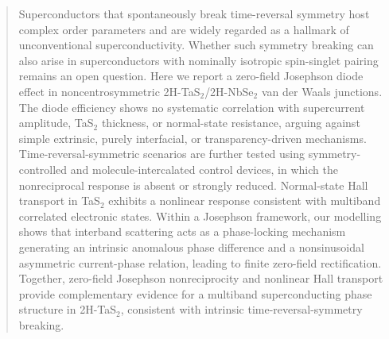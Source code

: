\documentclass[twocolumn,secnumarabic,amssymb, nobibnotes, aps, prl, superscriptaddress]{revtex4-2}
\begin{document}
\begin{abstract}
Superconductors that spontaneously break time-reversal symmetry host complex order parameters and are widely regarded as a hallmark of unconventional superconductivity. Whether such symmetry breaking can also arise in superconductors with nominally isotropic spin-singlet pairing remains an open question. Here we report a zero-field Josephson diode effect in noncentrosymmetric 2H-TaS$_2$/2H-NbSe$_2$ van der Waals junctions. The diode efficiency shows no systematic correlation with supercurrent amplitude, TaS$_2$ thickness, or normal-state resistance, arguing against simple extrinsic, purely interfacial, or transparency-driven mechanisms. Time-reversal-symmetric scenarios are further tested using symmetry-controlled and molecule-intercalated control devices, in which the nonreciprocal response is absent or strongly reduced. Normal-state Hall transport in TaS$_2$ exhibits a nonlinear response consistent with multiband correlated electronic states. Within a Josephson framework, our modelling shows that interband scattering acts as a phase-locking mechanism generating an intrinsic anomalous phase difference and a nonsinusoidal asymmetric current-phase relation, leading to finite zero-field rectification. Together, zero-field Josephson nonreciprocity and nonlinear Hall transport provide complementary evidence for a multiband superconducting phase structure in 2H-TaS$_2$, consistent with intrinsic time-reversal-symmetry breaking.

\end{abstract}

\maketitle
\end{document}
